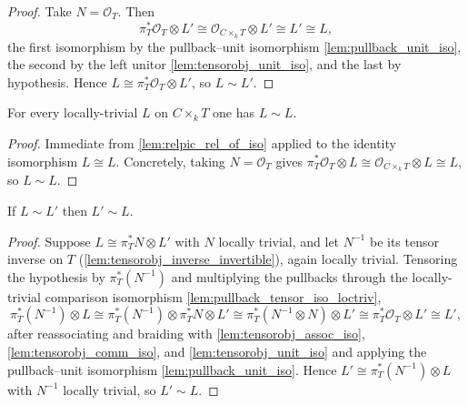 \begin{proof}
  \leanok
  Take \(N = \mathcal{O}_T\). Then
  \[
    \pi_T^* \mathcal{O}_T \otimes L'
      \cong \mathcal{O}_{C \times_k T} \otimes L'
      \cong L' \cong L ,
  \]
  the first isomorphism by the pullback--unit isomorphism
  \cref{lem:pullback_unit_iso}, the second by the left unitor
  \cref{lem:tensorobj_unit_iso}, and the last by hypothesis. Hence
  \(L \cong \pi_T^* \mathcal{O}_T \otimes L'\), so \(L \sim L'\).
\end{proof}

\begin{lemma}\leanok
  \label{lem:relpic_setoid_refl}
  For every locally-trivial \(L\) on \(C \times_k T\) one has \(L \sim L\).
\end{lemma}

\begin{proof}
  Immediate from \cref{lem:relpic_rel_of_iso} applied to the identity
  isomorphism \(L \cong L\). Concretely, taking \(N = \mathcal{O}_T\) gives
  \(\pi_T^* \mathcal{O}_T \otimes L \cong \mathcal{O}_{C \times_k T} \otimes L
  \cong L\), so \(L \sim L\).
\leanok
\end{proof}

\begin{lemma}\leanok
  \label{lem:relpic_setoid_symm}
  If \(L \sim L'\) then \(L' \sim L\).
\end{lemma}

\begin{proof}
  Suppose \(L \cong \pi_T^* N \otimes L'\) with \(N\) locally trivial, and let
  \(N^{-1}\) be its tensor inverse on \(T\)
  (\cref{lem:tensorobj_inverse_invertible}), again locally trivial. Tensoring
  the hypothesis by \(\pi_T^*(N^{-1})\) and multiplying the pullbacks through
  the locally-trivial comparison isomorphism
  \cref{lem:pullback_tensor_iso_loctriv},
  \[
    \pi_T^*(N^{-1}) \otimes L
      \cong \pi_T^*(N^{-1}) \otimes \pi_T^* N \otimes L'
      \cong \pi_T^*(N^{-1} \otimes N) \otimes L'
      \cong \pi_T^* \mathcal{O}_T \otimes L'
      \cong L' ,
  \]
  after reassociating and braiding with
  \cref{lem:tensorobj_assoc_iso}, \cref{lem:tensorobj_comm_iso}, and
  \cref{lem:tensorobj_unit_iso}
  and applying the pullback--unit isomorphism \cref{lem:pullback_unit_iso}.
  Hence \(L' \cong \pi_T^*(N^{-1}) \otimes L\) with \(N^{-1}\) locally trivial,
  so \(L' \sim L\).
\leanok
\end{proof}

